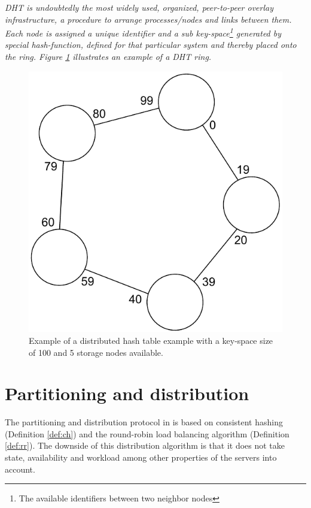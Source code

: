 \begin{definition} \label{def:dht}
\textit{DHT is undoubtedly the most widely used, organized, peer-to-peer overlay infrastructure, a procedure to arrange processes/nodes and links between them. Each node is assigned a unique identifier and a sub key-space\footnote{The available identifiers between two neighbor nodes}  generated by special hash-function, defined for that particular system and thereby placed onto the ring. Figure \ref{fig:dht} illustrates an example of a DHT ring.}

\begin{figure}[h!]
	\centering
	\includegraphics[scale=0.6]{pdf/dht.pdf}
	\vspace*{3mm}
	\caption[]{Example of a distributed hash table example with a key-space size of 100 and 5 storage nodes available. \label{fig:dht}}
\end{figure}
\end{definition}

\section{Partitioning and distribution} \label{sec:pandd}
The partitioning and distribution protocol in \CodeName is based on consistent hashing (Definition \ref{def:ch}) and the round-robin load balancing algorithm (Definition \ref{def:rr}). The downside of this distribution algorithm is that it does not take state, availability and workload among other properties of the servers into account. 
\newline

